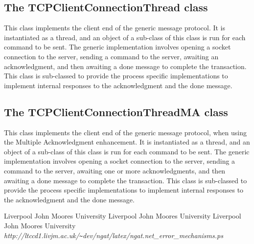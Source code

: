 \documentclass[10pt,a4paper]{article}
\begin{document}
\subsection{The TCPClientConnectionThread class}
This class implements the client end of the generic message protocol. It is instantiated as a thread,
and an object of a sub-class of this class is run for each command to be sent. The generic implementation involves
opening a socket connection to the server, sending a command to the server, awaiting an acknowledgment, 
and then awaiting a done message to complete the transaction. This class is sub-classed to provide the process
specific implementations to implement internal responses to the acknowledgment and the done message.

\subsection{The TCPClientConnectionThreadMA class}
This class implements the client end of the generic message protocol, when using the Multiple Acknowledgment 
enhancement. It is instantiated as a thread,
and an object of a sub-class of this class is run for each command to be sent. The generic implementation involves
opening a socket connection to the server, sending a command to the server, awaiting one or more acknowledgments, 
and then awaiting a done message to complete the transaction. This class is sub-classed to provide the process
specific implementations to implement internal responses to the acknowledgment and the done message.

\begin{thebibliography}{99}
Liverpool John Moores University
Liverpool John Moores University 
Liverpool John Moores University {\em http://ltccd1.livjm.ac.uk/\verb'~'dev/ngat/latex/ngat.net\_error\_mechanisms.ps}
\end{thebibliography}
\end{document}
